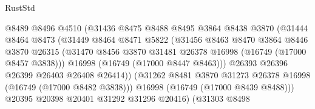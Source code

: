\begin{lexlean}{RustStd}
\begin{coremodule}
                                  @8489
                                  @8496
                                  @4510
                                  (@31436
                                    @8475
                                    @8488
                                    @8495
                                    @3864
                                    @8438
                                    @3870
                                    (@31444
                                      @8464
                                      @8473
                                      (@31449
                                        @8464
                                        @8471
                                        @5822
                                        (@31456
                                          @8463
                                          @8470
                                          @3864
                                          @8446
                                          @3870
                                          @26315
                                          (@31470
                                            @8456
                                            @3870
                                            @31481
                                            @26378
                                            @16998
                                            (@16749 (@17000 @8457 @3838)))
                                          @16998
                                          (@16749 (@17000 @8447 @8463)))
                                        @26393
                                        @26396
                                        @26399
                                        @26403
                                        @26408
                                        @26414))
                                    (@31262
                                      @8481
                                      @3870
                                      @31273
                                      @26378
                                      @16998
                                      (@16749 (@17000 @8482 @3838)))
                                    @16998
                                    (@16749 (@17000 @8439 @8488)))
                                  @20395
                                  @20398
                                  @20401
                                  @31292
                                  @31296
                                  @20416)
                                (@31303
                                  @8498

\end{coremodule}
\end{lexlean}
